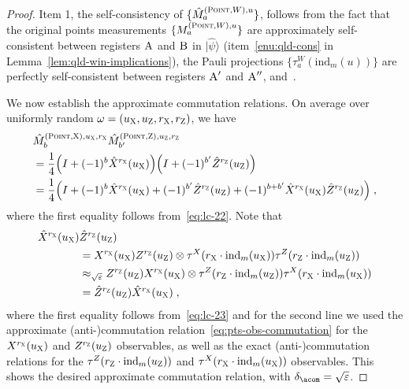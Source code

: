 \documentclass[11pt]{article}
\theoremstyle{definition}
\newcommand{\ket}[1]{|#1\rangle}
\newcommand{\Id}{\ensuremath{I}}
\newcommand{\ind}{\ensuremath{\mathrm{ind}}}
\newcommand{\eps}{\varepsilon}
\newcommand{\labelstyle}[1]{\ensuremath{\textsc{#1}}\xspace}
\newcommand{\xpt}{\labelstyle{X}}
\newcommand{\zpt}{\labelstyle{Z}}
\newcommand{\alice}{\labelstyle{A}}
\newcommand{\bob}{\labelstyle{B}}
\newcommand{\typestyle}[1]{\ensuremath{\textsc{#1}}\xspace}
\newcommand{\Point}{\typestyle{Point}}
\begin{document}
\begin{proof}
Item 1, the self-consistency of $\{\hat{M}^{(\Point,W),u}_a \}$, follows from the fact that the original points measurements $\{ M^{(\Point,W),u}_a \}$ are approximately self-consistent between registers $\alice$ and $\bob$ in $\ket{\hat{\psi}}$ (item~\ref{enu:qld-cons} in Lemma~\ref{lem:qld-win-implications}), the Pauli projections $\{\tau^W_a(\ind_m(u))\}$ are perfectly self-consistent between registers $\alice'$ and $\alice''$, and~. 
	
	We now establish the approximate commutation relations. On average over uniformly random $\omega = (u_\xpt,u_\zpt,r_\xpt,r_\zpt)$, we have
	\begin{align*}
	&\hat{M}^{(\Point,\xpt),u_\xpt,r_\xpt}_{b} \hat{M}^{(\Point,\zpt),u_\zpt,r_\zpt}_{b'}  \label{eq:qld-m-x-m-z} \\
	&= \frac{1}{4} \Big ( \Id + (-1)^b \hat{X}^{r_\xpt}(u_\xpt) \Big ) \Big ( \Id + (-1)^{b'} \hat{Z}^{r_\zpt}(u_\zpt) \Big ) \\
	&= \frac{1}{4} \Big ( \Id + (-1)^b \hat{X}^{r_\xpt}(u_\xpt) + (-1)^{b'} \hat{Z}^{r_\zpt}(u_\zpt) + (-1)^{b + b'} \hat{X}^{r_\xpt}(u_\xpt) \hat{Z}^{r_\zpt}(u_\zpt) \Big)\;,
	\end{align*}
	where the first equality follows from~\eqref{eq:lc-22}.	
	Note that
	\begin{align*}
	\hat{X}^{r_\xpt}(u_\xpt)
         & \hat{Z}^{r_\zpt}(u_\zpt) \\
				&=
                                             X^{r_\xpt}(u_\xpt)
                                             Z^{r_\zpt}(u_\zpt)
                                             \otimes \tau^X(r_\xpt
                                             \cdot \ind_m(u_\xpt))
                                             \tau^Z(r_\zpt \cdot \ind_m(u_\zpt)) \\
	&\approx_{\sqrt{\eps}} Z^{r_\zpt}(u_\zpt)
   X^{r_\xpt}(u_\xpt)  \otimes \tau^Z(r_\zpt\cdot \ind_m( u_\zpt))
   \tau^X(r_\xpt \cdot \ind_m(u_\xpt)) \\
	&= \hat{Z}^{r_\zpt}(u_\zpt) \hat{X}^{r_\xpt}(u_\xpt)\;, 
	\end{align*}
	where the first equality follows from~\eqref{eq:lc-23} and for the second line we used the approximate (anti-)commutation
        relation~\eqref{eq:pts-obs-commutation} for the
        $X^{r_\xpt}(u_\xpt)$ and  $Z^{r_\zpt}(u_\zpt)$
        observables, as well as the exact (anti-)commutation relations
        for the $\tau^Z(r_\zpt \cdot \ind_m(u_\zpt))$ and
        $\tau^X(r_\xpt \cdot \ind_m(u_\xpt))$ observables. This shows
        the desired approximate commutation relation, with
        $\delta_{\acom} = \sqrt{\eps}$.
\end{proof}
\end{document}
